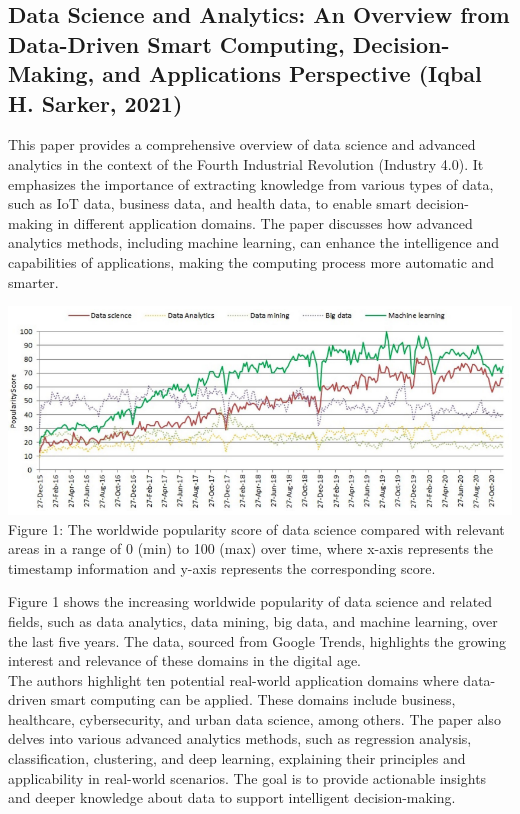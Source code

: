 \documentclass[a4paper, 12pt]{article}
\begin{document}
\subsection{Data Science and Analytics: An Overview from Data-Driven Smart Computing,  Decision-Making, and Applications Perspective (Iqbal H. Sarker, 2021)}
This paper provides a comprehensive overview of data science and advanced analytics in the context of the Fourth Industrial Revolution (Industry 4.0). It emphasizes the importance of extracting knowledge from various types of data, such as IoT data, business data, and health data, to enable smart decision-making in different application domains. The paper discusses how advanced analytics methods, including machine learning, can enhance the intelligence and capabilities of applications, making the computing process more automatic and smarter. 
\begin{center}
\includegraphics[scale=0.9]{Figure1.png}\\
\small Figure 1: The worldwide popularity score of data science compared with relevant areas in a range of 0 (min) to 100 (max) over time, where x-axis represents the timestamp information and y-axis represents the corresponding score.\normalsize
\end{center}

Figure 1 shows the increasing worldwide popularity of data science and related fields, such as data analytics, data mining, big data, and machine learning, over the last five years. The data, sourced from Google Trends, highlights the growing interest and relevance of these domains in the digital age.\\

 The authors highlight ten potential real-world application domains where data-driven smart computing can be applied. These domains include business, healthcare, cybersecurity, and urban data science, among others. The paper also delves into various advanced analytics methods, such as regression analysis, classification, clustering, and deep learning, explaining their principles and applicability in real-world scenarios. The goal is to provide actionable insights and deeper knowledge about data to support intelligent decision-making.\\
 
\end{document}
